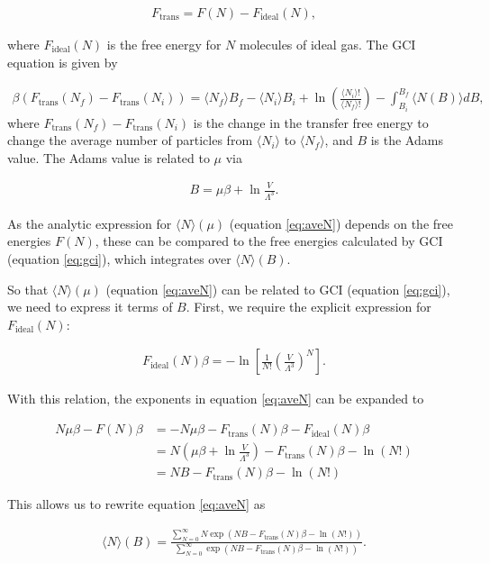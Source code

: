 \documentclass[10pt,a4paper]{article}
\begin{document}
\begin{align}
F_\text{trans} = F(N) - F_\text{ideal}(N),
\end{align}

where $F_\text{ideal}(N)$ is the free energy for $N$ molecules of ideal gas. The GCI equation is given by

\begin{align}
 \beta(F_\text{trans}(N_f) - F_\text{trans}(N_i))  =  \langle N_f \rangle B_f -  \langle N_i\rangle B_i + \ln \left(\frac{\langle N_i \rangle !}{ \langle N_f\rangle !}\right) - \int_{B_i}^{B_f}  \langle N(B) \rangle d B, 
 \label{eq:gci}
\end{align}
where $F_\text{trans}(N_f) - F_\text{trans}(N_i)$ is the change in the transfer free energy to change the average number of particles from $\langle N_i \rangle$ to  $\langle N_f \rangle$, and $B$ is the Adams value. The Adams value is related to $\mu$ via

\begin{align}
B = \mu\beta + \ln\frac{V}{\Lambda^3}.
\end{align}

As the analytic expression for $\langle N \rangle(\mu)$ (equation \ref{eq:aveN}) depends on the free energies $F(N)$, these can be compared to the free energies calculated by GCI (equation \ref{eq:gci}), which integrates over $\langle N \rangle(B)$.

So that $\langle N \rangle(\mu)$ (equation \ref{eq:aveN}) can be related to GCI (equation \ref{eq:gci}), we need to express it terms of $B$. First, we require the explicit expression for $F_\text{ideal}(N)$:

\begin{align}
F_\text{ideal}(N)\beta = -\ln\left[\frac{1}{N!}\left(\frac{V}{\Lambda^3}\right)^N\right].
\end{align}

With this relation, the exponents in equation \ref{eq:aveN} can be expanded to

\begin{align*}
N\mu\beta - F(N)\beta  &= -N\mu\beta -  F_\text{trans}(N)\beta - F_\text{ideal}(N)\beta \\
&= N(\mu\beta + \ln\frac{V}{\Lambda^3}) - F_\text{trans}(N)\beta  - \ln(N!) \\
&= NB - F_\text{trans}(N)\beta  - \ln(N!)
\end{align*}

This allows us to rewrite equation \ref{eq:aveN} as 

\begin{align}
\langle N \rangle(B) = \frac{\sum_{N=0}^\infty N\exp(NB - F_\text{trans}(N)\beta  - \ln(N!))}{\sum_{N=0}^\infty \exp(NB - F_\text{trans}(N)\beta  - \ln(N!))}.
\label{eq:aveN2}
\end{align}
\end{document}
